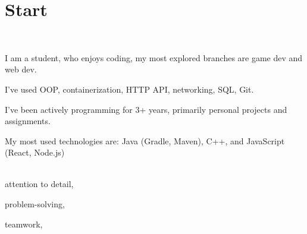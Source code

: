 \documentclass[pastel]{simplehipstercv}
\begin{document}
\pagestyle{empty}

\section*{Start}


\vspace{6em}

\setlength{\columnsep}{1cm}
\begin{paracol}{2}

    \footnotesize

    \flushleft

    \bigskip


    \bigskip


    \bigskip

    \\[0.5em]

    {\footnotesize
    I am a student, who enjoys coding, my most explored branches are game dev and web dev.

    I've used OOP, containerization, HTTP API, networking, SQL, Git.

    I've been actively programming for 3+ years, primarily personal projects and assignments.

    My most used technologies are: Java (Gradle, Maven), C++, and JavaScript (React, Node.js)
    }

    \bigskip

    \\[0.5em]
    attention to detail,

    problem-solving,

    teamwork,


\end{paracol}
\end{document}
